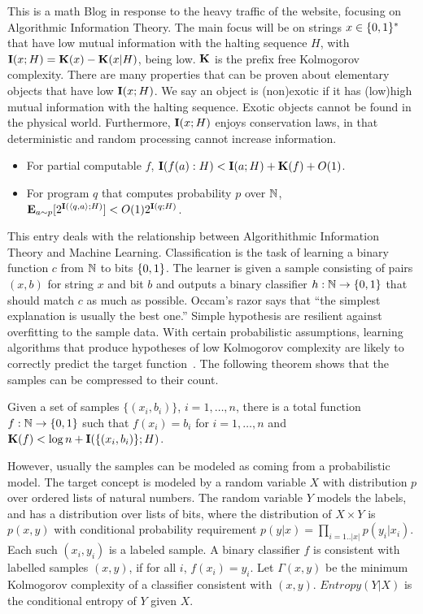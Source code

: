 \documentclass[11pt]{article}\textwidth 6.5in\textheight 9in
\begin{document}
This is a math Blog in response to the heavy traffic of the website, focusing on Algorithmic Information Theory. The main focus will be on strings $x\in\{0,1\}^*$ that have low mutual information with the halting sequence $H$, with ${\mathbf I}(x;H)={\mathbf K}(x)-{\mathbf K}(x|H)$, being low. ${\mathbf K}$ is the prefix free Kolmogorov complexity. There are many properties that can be proven about elementary objects that have low ${\mathbf I}(x;H)$. We say an object is (non)exotic if it has (low)high mutual information with the halting sequence. Exotic objects cannot be found in the physical world. Furthermore, ${\mathbf I}(x;H)$ enjoys conservation laws, in that deterministic and random processing cannot increase information.
\begin{itemize}
\item For partial computable $f$, ${\mathbf I}(f(a):H)< {\mathbf I}(a;H)+{\mathbf K}(f)+O(1)$.
\item For program $q$ that computes probability $p$ over $\mathbb{N}$, ${\mathbf E}_{a\sim p}[2^{{\mathbf I}(\langle q,a\rangle;H)}]< O(1)2^{{\mathbf I}(q;H)}$.
\end{itemize}
This entry deals with the relationship between Algorithithmic Information Theory and Machine Learning. Classification is the task of learning a binary function $c$  from $\mathbb{N}$ to bits $\{0,1\}$. The learner is given a sample consisting of pairs $(x,b)$ for string $x$ and bit $b$ and outputs a binary classifier $h:\mathbb{N}\rightarrow\{0,1\}$ that should match $c$ as much as possible. Occam's razor says that ``the simplest explanation is usually the best one.'' Simple hypothesis are resilient against overfitting to the sample data. With certain probabilistic assumptions, learning algorithms that produce hypotheses of low Kolmogorov complexity are likely to correctly predict the target function~\cite{BlumerEhHaWar89}. The following theorem shows that the samples can be compressed to their count.

\begin{thr}
Given a set of samples $\{(x_i,b_i)\}$, $i=1,\dots,n$, there is a total function $f:\mathbb{N}\rightarrow\{0,1\}$ such that $f(x_i)=b_i$ for $i=1,\dots,n$ and ${\mathbf K}(f)<\log n + {\mathbf I}(\{(x_i,b_i)\};H)$.
\end{thr}


However, usually the samples can be modeled as coming from a probabilistic model. The target concept is modeled by a random variable $X$ with distribution $p$ over ordered lists of natural numbers. The random variable $Y$ models the labels, and has a distribution over lists of bits, where the distribution of $X\times Y$ is $p(x,y)$ with conditional probability requirement $p(y|x)=\prod_{i=1..|x|}p(y_i|x_i)$. Each such $(x_i,y_i)$ is a labeled sample. A binary classifier $f$ is consistent with labelled samples $(x,y)$, if for all $i$, $f(x_i)=y_i$. Let $\Gamma(x,y)$ be the minimum Kolmogorov complexity of a classifier consistent with $(x,y)$. $Entropy(Y|X)$ is the conditional entropy of $Y$ given $X$.
\end{document}
